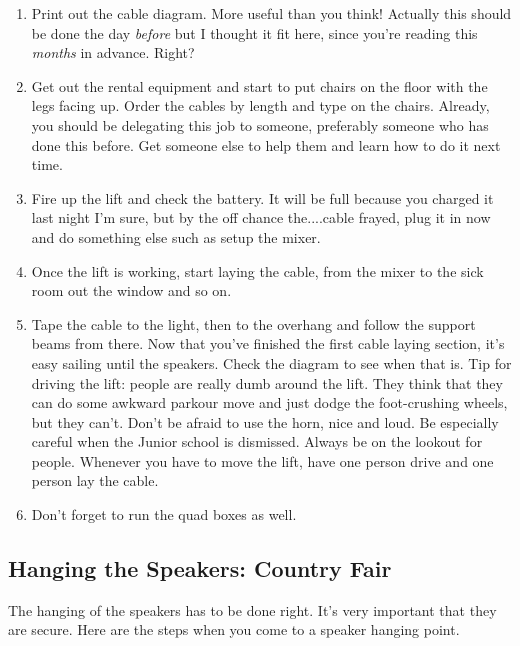 \documentclass[11pt,a4paper]{book}
\begin{document}
\begin{enumerate}
\item Print out the cable diagram. More useful than you think! Actually this should be done the day \textit{before} but I thought it fit here, since you're reading this \textit{months} in advance. Right?
\item Get out the rental equipment and start to put chairs on the floor with the legs facing up. Order the cables by length and type on the chairs. Already, you should be delegating this job to someone, preferably someone who has done this before. Get someone else to help them and learn how to do it next time.
\item Fire up the lift and check the battery. It will be full because you charged it last night I'm sure, but by the off chance the....cable frayed, plug it in now and do something else such as setup the mixer.
\item Once the lift is working, start laying the cable, from the mixer to the sick room out the window and so on.
\item Tape the cable to the light, then to the overhang and follow the support beams from there. Now that you've finished the first cable laying section, it's easy sailing until the speakers. Check the diagram to see when that is. Tip for driving the lift: people are really dumb around the lift. They think that they can do some awkward parkour move and just dodge the foot-crushing wheels, but they can't. Don't be afraid to use the horn, nice and loud. Be especially careful when the Junior school is dismissed. Always be on the lookout for people. Whenever you have to move the lift, have one person drive and one person lay the cable.
\item Don't forget to run the quad boxes as well.
\end{enumerate}

\subsection{Hanging the Speakers: Country Fair}
The hanging of the speakers has to be done right. It's very important that they are secure. Here are the steps when you come to a speaker hanging point.
\end{document}
